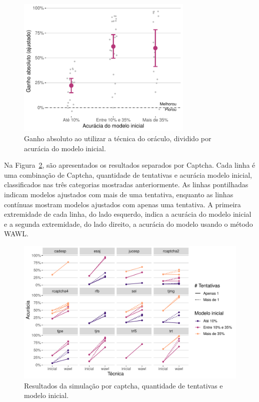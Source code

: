 \documentclass[12pt,twoside,brazilian]{book}
\begin{document}
\begin{figure}

{\centering \includegraphics[width=0.75\textwidth,height=\textheight]{./resultados_files/figure-pdf/fig-simulacao-geral-inicial-absoluto-ajustado-1.pdf}

}

\caption{\label{fig-simulacao-geral-inicial-absoluto-ajustado}Ganho
absoluto ao utilizar a técnica do oráculo, dividido por acurácia do
modelo inicial.}

\end{figure}

Na Figura~\ref{fig-simulacao-captcha}, são apresentados os resultados
separados por Captcha. Cada linha é uma combinação de Captcha,
quantidade de tentativas e acurácia modelo inicial, classificados nas
três categorias mostradas anteriormente. As linhas pontilhadas indicam
modelos ajustados com mais de uma tentativa, enquanto as linhas
contínuas mostram modelos ajustados com apenas uma tentativa. A primeira
extremidade de cada linha, do lado esquerdo, indica a acurácia do modelo
inicial e a segunda extremidade, do lado direito, a acurácia do modelo
usando o método WAWL.

\begin{figure}

{\centering \includegraphics[width=1\textwidth,height=\textheight]{./resultados_files/figure-pdf/fig-simulacao-captcha-1.pdf}

}

\caption{\label{fig-simulacao-captcha}Resultados da simulação por
captcha, quantidade de tentativas e modelo inicial.}

\end{figure}
\end{document}
